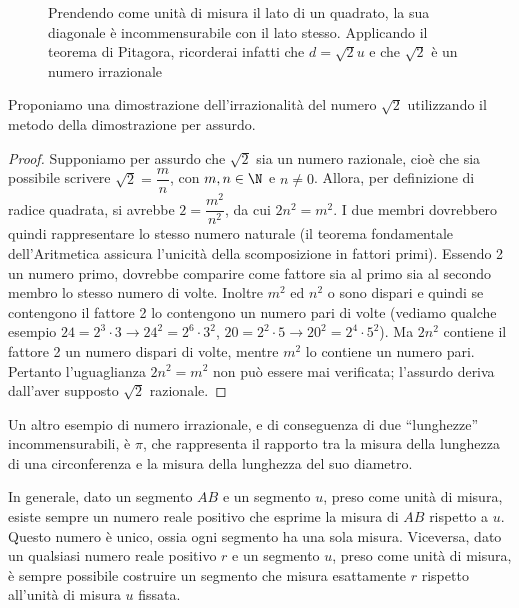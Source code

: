 \begin{enumerate}
\begin{inaccessibleblock}
 \begin{figure}[htb]
\centering
\caption{Prendendo come unità di misura il lato di un quadrato, la 
sua diagonale è incommensurabile con il lato stesso. Applicando il 
teorema di Pitagora, ricorderai infatti che $d=\sqrt{2}u$ e che 
$\sqrt{2}$ è un numero irrazionale}
\end{figure}
\end{inaccessibleblock}

Proponiamo una dimostrazione dell'irrazionalità del numero $\sqrt{2}$ 
utilizzando il metodo della dimostrazione per assurdo.


\begin{proof}
Supponiamo per assurdo che $\sqrt{2}$ sia un numero razionale, cioè 
che sia possibile scrivere $\sqrt{2}=\dfrac{m}{n}$, con $m,n \in 
\N$ e $n\neq 0$. Allora, per definizione di radice quadrata, si 
avrebbe $2=\dfrac{m^2}{n^2}$, da cui $2n^2=m^2$. I due membri 
dovrebbero quindi rappresentare lo stesso numero naturale (il teorema 
fondamentale dell'Aritmetica assicura l'unicità della scomposizione 
in fattori primi). Essendo 2 un numero primo, dovrebbe comparire come 
fattore sia al primo sia al secondo membro lo stesso numero di volte. 
Inoltre $m^2$ ed $n^2$ o sono dispari e quindi se contengono il 
fattore 2 lo contengono un numero pari di volte (vediamo qualche 
esempio $24=2^3\cdot3 \rightarrow 24^2=2^6\cdot3^2$, $20=2^2\cdot5 
\rightarrow 20^2=2^4\cdot5^2$). Ma $2n^2$ contiene il fattore 2 un 
numero dispari di volte, mentre $m^2$ lo contiene un numero pari. 
Pertanto l'uguaglianza $2n^2=m^2$ non può essere mai verificata; 
l'assurdo deriva dall'aver supposto $\sqrt{2}$ razionale.
\end{proof}

Un altro esempio di numero irrazionale, e di conseguenza di due 
``lunghezze'' incommensurabili, è $\pi$, che rappresenta il rapporto 
tra la misura della lunghezza di una circonferenza e la misura della 
lunghezza del suo diametro.
\end{enumerate}

In generale, dato un segmento $AB$ e un segmento $u$, preso come 
unità di misura, esiste sempre un numero reale positivo che esprime 
la misura di $AB$ rispetto a $u$. Questo numero è unico, ossia ogni 
segmento ha una sola misura. Viceversa, dato un qualsiasi numero 
reale positivo $r$ e un segmento $u$, preso come unità di misura, è 
sempre possibile costruire un segmento che misura esattamente $r$ 
rispetto all'unità di misura $u$ fissata.

